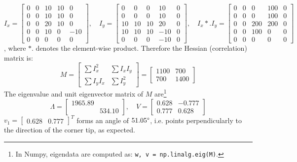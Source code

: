 \documentclass[a4paper]{article}
\begin{document}
\[
I_x = 
\begin{bmatrix}
0 & 0 & 10 & 10 & 0 \\
0 & 0 & 10 & 10 & 0\\
0 & 0 & 20& 10 & 0 \\
0 & 0 & 10 & 0 & -10 \\
0 & 0 & 0 & 0 & 0
\end{bmatrix}, \quad
I_y = 
\begin{bmatrix}
0 & 0 & 0 & 10 & 0 \\
0 & 0 & 0 & 10 & 0\\
10 & 10 & 10 & 20 & 0 \\
10 & 10 & 10 & -10 & 0 \\
0 & 0 & 0 & -10 & 0 
\end{bmatrix}, \quad
I_x *. I_y  = 
\begin{bmatrix}
0 & 0 & 0 & 100 & 0 \\
0 & 0 & 0 & 100 & 0\\
0 & 0 & 200 & 200 & 0 \\
0 & 0 & 100 & 0 & 0 \\
0 & 0 & 0 & 0 & 0 
\end{bmatrix}
\]
, where $*.$ denotes the element-wise product. Therefore the Hessian (correlation) matrix is:
\[
M = \begin{bmatrix}
\sum I_x^2 & \sum I_xI_y \\
\sum I_yI_x & \sum I_y^2
\end{bmatrix} =
\begin{bmatrix}
1100 & 700 \\
700 & 1400
\end{bmatrix}
\]
The eigenvalue and unit eigenvector matrix of $M$ are\footnote{In Numpy, eigendata are computed as: \texttt{w, v = np.linalg.eig(M)}.}
\[
\Lambda = 
\begin{bmatrix}
1965.89 & \\
 & 534.10
\end{bmatrix},\quad 
V =
\begin{bmatrix}
0.628 & -0.777\\
0.777 & 0.628
\end{bmatrix}
\]
$v_1 = \begin{bmatrix} 0.628 & 0.777 \end{bmatrix}^T$ forms an angle of $51.05\degree$, i.e. points perpendicularly to the direction of the corner tip, as expected.
\end{document}
